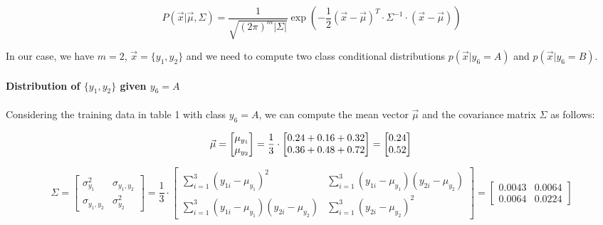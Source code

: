 \documentclass{article}
\begin{document}
\[
  P(\vec{x}| \vec{\mu}, \Sigma) = \frac{1}{\sqrt{(2\pi)^m |\Sigma|}} \exp \left( -\frac{1}{2} (\vec{x} - \vec{\mu})^T \cdot \Sigma^{-1} \cdot (\vec{x} - \vec{\mu}) \right)
  \]

In our case, we have $m = 2$, $\vec{x} = \{y_1, y_2\}$ and we need to compute two class conditional distributions $p(\vec{x}|y_6=A)$ and $p(\vec{x}|y_6=B)$.

\paragraph{Distribution of $\{y_1,y_2\}$ given $y_6=A$}
\paragraph{}

Considering the training data in table 1 with class $y_6=A$, we can compute the mean vector $\vec{\mu}$ and the covariance matrix $\Sigma$ as follows:

\[
  \vec{\mu} =  \left[\begin{matrix} \mu_{y_1} \\ \mu_{y_2} \end{matrix} \right]= \frac{1}{3} \cdot 
  \left[\begin{matrix}
    0.24 + 0.16 + 0.32 \\
    0.36 + 0.48 + 0.72
  \end{matrix}\right] = \left[\begin{matrix}
    0.24 \\
    0.52
  \end{matrix}\right] \\
\]

\[
  \Sigma = \left[ \begin{matrix}
    \sigma_{y_1}^2 & \sigma_{y_1,y_2} \\
    \sigma_{y_1,y_2} & \sigma_{y_2}^2
  \end{matrix} \right] = \frac{1}{3} \cdot \begin{bmatrix}
    \sum_{i=1}^{3} (y_{1i} - \mu_{y_1})^2 & \sum_{i=1}^{3} (y_{1i} - \mu_{y_1})(y_{2i} - \mu_{y_2}) \\
    \sum_{i=1}^{3} (y_{1i} - \mu_{y_1})(y_{2i} - \mu_{y_2}) & \sum_{i=1}^{3} (y_{2i} - \mu_{y_2})^2
  \end{bmatrix}  = \begin{bmatrix}
    0.0043 & 0.0064 \\
    0.0064 & 0.0224
  \end{bmatrix}
\]
\end{document}
